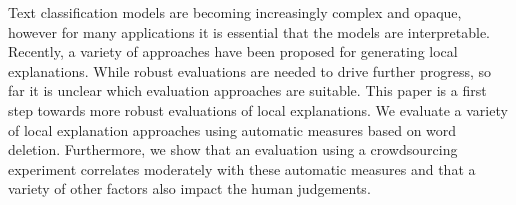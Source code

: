 Text classification models are  becoming increasingly complex and opaque, however for many applications it is essential that the models are interpretable. Recently, a variety of approaches have been proposed for generating local explanations. While robust evaluations are needed to drive further progress, so far it is unclear which evaluation approaches are suitable.  This paper is a first step towards more robust evaluations of local explanations. We evaluate a variety of local explanation approaches using automatic measures based on word deletion. Furthermore, we show that an evaluation using a crowdsourcing experiment correlates moderately with these automatic measures and that a variety of other factors also impact the human judgements.
